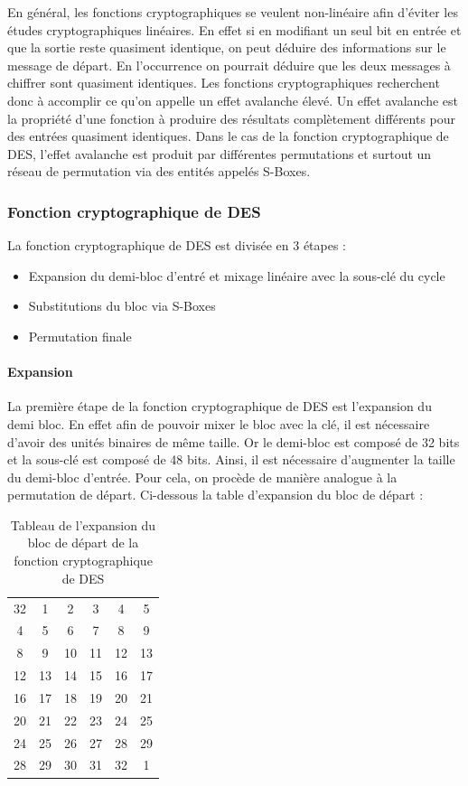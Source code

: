 \documentclass[a4paper]{article}
\begin{document}
En général, les fonctions cryptographiques se veulent non-linéaire afin d'éviter les études cryptographiques linéaires. En effet si en modifiant un seul bit en entrée et que la sortie reste quasiment identique, on peut déduire des informations sur le message de départ. En l'occurrence on pourrait déduire que les deux messages à chiffrer sont quasiment identiques. Les fonctions cryptographiques recherchent donc à accomplir ce qu'on appelle un effet avalanche élevé. Un effet avalanche est la propriété d'une fonction à produire des résultats complètement différents pour des entrées quasiment identiques.
\smallbreak
Dans le cas de la fonction cryptographique de DES, l'effet avalanche est produit par différentes permutations et surtout un réseau de permutation via des entités appelés S-Boxes.

\subsubsection{Fonction cryptographique de DES}
La fonction cryptographique de DES est divisée en 3 étapes :
\begin{itemize}
\item Expansion du demi-bloc d'entré et mixage linéaire avec la sous-clé du cycle
\item Substitutions du bloc via S-Boxes
\item Permutation finale 
\end{itemize}

\paragraph{Expansion}
\smallbreak
La première étape de la fonction cryptographique de DES est l'expansion du demi bloc. En effet afin de pouvoir mixer le bloc avec la clé, il est nécessaire d'avoir des unités binaires de même taille. Or le demi-bloc est composé de 32 bits et la sous-clé est composé de 48 bits. Ainsi, il est nécessaire d'augmenter la taille du demi-bloc d'entrée. Pour cela, on procède de manière analogue à la permutation de départ. Ci-dessous la table d'expansion du bloc de départ :

\begin{table}[h]
\centering
\begin{tabular}{|cccccc|}
  \hline
  32 & 1 & 2 & 3 & 4 & 5 \\
  4 & 5 & 6 & 7 & 8 & 9 \\
  8 & 9 & 10 & 11 & 12 & 13 \\
  12 & 13 & 14 & 15 & 16 & 17 \\
  16 & 17 & 18 & 19 & 20 & 21 \\
  20 & 21 & 22 & 23 & 24 & 25 \\
  24 & 25 & 26 & 27 & 28 & 29 \\
  28 & 29 & 30 & 31 & 32 & 1 \\
  \hline
\end{tabular}
\caption{Tableau de l'expansion du bloc de départ de la fonction cryptographique de DES}
\end{table}
\end{document}
